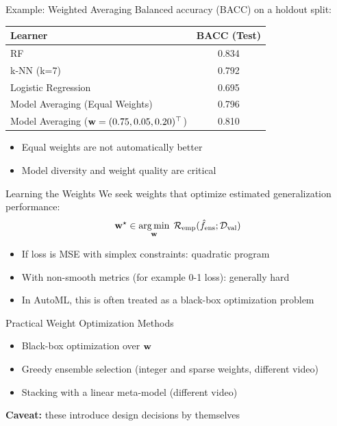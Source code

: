 \documentclass[main]{subfiles}
\begin{document}
\begin{frame}{Example: Weighted Averaging}
Balanced accuracy (BACC) on a holdout split:
\begin{table}[h]
\centering
\begin{tabular}{lc}
\hline
\textbf{Learner} & \textbf{BACC (Test)} \\
\hline
RF & 0.834 \\
k-NN (k=7) & 0.792 \\
Logistic Regression & 0.695 \\
Model Averaging (Equal Weights) & 0.796 \\
Model Averaging ($\mathbf{w}=(0.75,0.05,0.20)^\top$) & 0.810 \\
\hline
\end{tabular}
\end{table}
\vspace{0.2cm}
\begin{itemize}
    \item Equal weights are not automatically better
    \item Model diversity and weight quality are critical
\end{itemize}
\end{frame}

\begin{frame}{Learning the Weights}
We seek weights that optimize estimated generalization performance:
\[
\mathbf{w}^{\star} \in \operatorname*{arg\,min}_{\mathbf{w}}\; \mathcal{R}_{\text{emp}}(\hat{f}_{\text{ens}};\mathcal{D}_{\text{val}})
\]
\begin{itemize}
    \item If loss is MSE with simplex constraints: quadratic program
    \item With non-smooth metrics (for example 0-1 loss): generally hard
    \item In AutoML, this is often treated as a black-box optimization problem
\end{itemize}
\end{frame}

\begin{frame}{Practical Weight Optimization Methods}
\begin{itemize}
    \item Black-box optimization over $\mathbf{w}$
    \item Greedy ensemble selection (integer and sparse weights, different video)
    \item Stacking with a linear meta-model (different video)
\end{itemize}
\vspace{0.3cm}
\textbf{Caveat:} these introduce design decisions by themselves
\end{frame}
\end{document}
